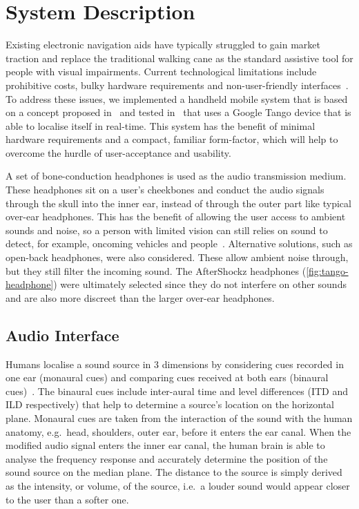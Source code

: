 \documentclass{article}
\begin{document}
\section{System Description}\label{sec:system-description}

Existing electronic navigation aids have typically struggled to gain market traction and replace the traditional walking cane as the standard assistive tool for people with visual impairments.
Current technological limitations include prohibitive costs, bulky hardware requirements and non-user-friendly interfaces~\cite{golledge2004stated,yusif2016older,arditi2013user}.
To address these issues, we implemented a handheld mobile system that is based on a concept proposed in~\cite{lock2017portable,lock2019active} and tested in~\cite{lock2019bone} that uses a Google Tango device that is able to localise itself in real-time.
This system has the benefit of minimal hardware requirements and a compact, familiar form-factor, which will help to overcome the hurdle of user-acceptance and usability.

A set of bone-conduction headphones is used as the audio transmission medium.
These headphones sit on a user's cheekbones and conduct the audio signals through the skull into the inner ear, instead of through the outer part like typical over-ear headphones. 
This has the benefit of allowing the user access to ambient sounds and noise, so a person with limited vision can still relies on sound to detect, for example, oncoming vehicles and people~\cite{lichtenstein2012headphone}.
Alternative solutions, such as open-back headphones, were also considered.
These allow ambient noise through, but they still filter the incoming sound.
The AfterShockz headphones (\cref{fig:tango-headphone}) were ultimately selected since they do not interfere on other sounds and are also more discreet than the larger over-ear headphones. 

\subsection{Audio Interface}

Humans localise a sound source in 3 dimensions by considering cues recorded in one ear (monaural cues) and comparing cues received at both ears (binaural cues)~\cite{blauert1997spatial,blauert1969sound}.
The binaural cues include inter-aural time and level differences (ITD and ILD respectively) that help to determine a source's location on the horizontal plane.
Monaural cues are taken from the interaction of the sound with the human anatomy, e.g.\ head, shoulders, outer ear, before it enters the ear canal.
When the modified audio signal enters the inner ear canal, the human brain is able to analyse the frequency response and accurately determine the position of the sound source on the median plane. 
The distance to the source is simply derived as the intensity, or volume, of the source, i.e.\ a louder sound would appear closer to the user than a softer one. 
\end{document}
